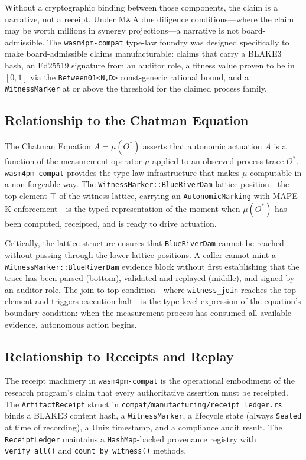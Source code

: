 Without a cryptographic binding between those components, the claim is a narrative, not
a receipt. Under M\&A due diligence conditions---where the claim may be worth millions
in synergy projections---a narrative is not board-admissible. The \texttt{wasm4pm-compat}
type-law foundry was designed specifically to make board-admissible claims manufacturable:
claims that carry a BLAKE3 hash, an Ed25519 signature from an auditor role, a fitness
value proven to be in $[0, 1]$ via the \texttt{Between01<N,D>} const-generic rational
bound, and a \texttt{WitnessMarker} at or above the threshold for the claimed process
family.

\subsection{Relationship to the Chatman Equation}
\label{sec:sources-wasm4pm-compat-lineage-chatman}

The Chatman Equation $A = \mu(O^*)$ asserts that autonomic actuation $A$ is a function
of the measurement operator $\mu$ applied to an observed process trace $O^*$.
\texttt{wasm4pm-compat} provides the type-law infrastructure that makes $\mu$ computable
in a non-forgeable way. The \texttt{WitnessMarker::BlueRiverDam} lattice position---the
top element \texttt{\(\top\)} of the witness lattice, carrying an \texttt{AutonomicMarking}
with MAPE-K enforcement---is the typed representation of the moment when $\mu(O^*)$
has been computed, receipted, and is ready to drive actuation.

Critically, the lattice structure ensures that \texttt{BlueRiverDam} cannot be reached
without passing through the lower lattice positions. A caller cannot mint a
\texttt{WitnessMarker::BlueRiverDam} evidence block without first establishing that the
trace has been parsed (bottom), validated and replayed (middle), and signed by an auditor
role. The join-to-top condition---where \texttt{witness\_join} reaches the top element and
triggers execution halt---is the type-level expression of the equation's boundary condition:
when the measurement process has consumed all available evidence, autonomous action begins.

\subsection{Relationship to Receipts and Replay}
\label{sec:sources-wasm4pm-compat-lineage-receipts}

The receipt machinery in \texttt{wasm4pm-compat} is the operational embodiment of the
research program's claim that every authoritative assertion must be receipted. The
\texttt{ArtifactReceipt} struct in \texttt{compat/manufacturing/receipt\_ledger.rs}
binds a BLAKE3 content hash, a \texttt{WitnessMarker}, a lifecycle state (always
\texttt{Sealed} at time of recording), a Unix timestamp, and a compliance audit result.
The \texttt{ReceiptLedger} maintains a \texttt{HashMap}-backed provenance registry with
\texttt{verify\_all()} and \texttt{count\_by\_witness()} methods.

